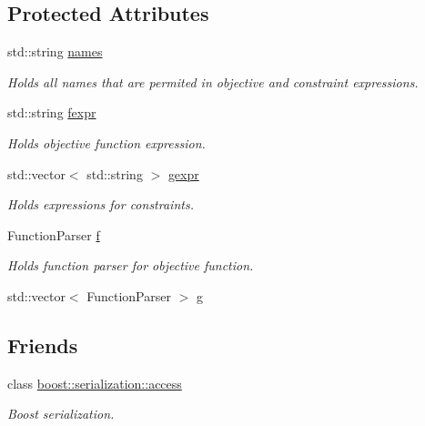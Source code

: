 \subsection*{Protected Attributes}
\begin{DoxyCompactItemize}
\item 
std\-::string \hyperlink{class_go_s_u_m_1_1_c_parser_optimization_problem_aa7f4b76eee9da8610745c67772c768d1}{names}
\begin{DoxyCompactList}\small\item\em Holds all names that are permited in objective and constraint expressions. \end{DoxyCompactList}\item 
std\-::string \hyperlink{class_go_s_u_m_1_1_c_parser_optimization_problem_a0e5ca56845f6f3b1fc0822ded4d8ff28}{fexpr}
\begin{DoxyCompactList}\small\item\em Holds objective function expression. \end{DoxyCompactList}\item 
std\-::vector$<$ std\-::string $>$ \hyperlink{class_go_s_u_m_1_1_c_parser_optimization_problem_a41e738f2f8251c6229a7aafd671cced0}{gexpr}
\begin{DoxyCompactList}\small\item\em Holds expressions for constraints. \end{DoxyCompactList}\item 
Function\-Parser \hyperlink{class_go_s_u_m_1_1_c_parser_optimization_problem_a0c6b06efec51542bc99e397b7d15afa0}{f}
\begin{DoxyCompactList}\small\item\em Holds function parser for objective function. \end{DoxyCompactList}\item 
std\-::vector$<$ Function\-Parser $>$ \hyperlink{class_go_s_u_m_1_1_c_parser_optimization_problem_a8ba8e1a4d04ba3ca2bc8367bf3c8aa19}{g}
\end{DoxyCompactItemize}
\subsection*{Friends}
\begin{DoxyCompactItemize}
\item 
class \hyperlink{class_go_s_u_m_1_1_c_parser_optimization_problem_ac98d07dd8f7b70e16ccb9a01abf56b9c}{boost\-::serialization\-::access}
\begin{DoxyCompactList}\small\item\em Boost serialization. \end{DoxyCompactList}\end{DoxyCompactItemize}



